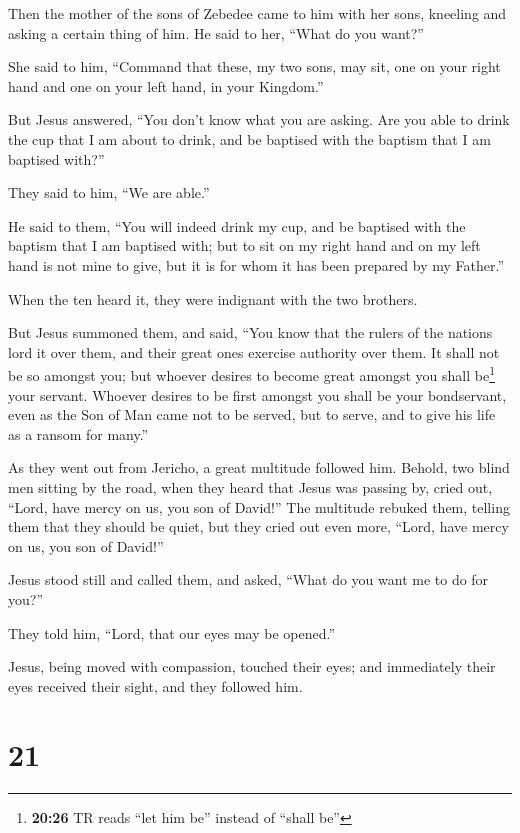  Then the mother of the sons of Zebedee came to him with
her sons, kneeling and asking a certain thing of him.  He
said to her, ``What do you want?''

She said to him, ``Command that these, my two sons, may sit, one on your
right hand and one on your left hand, in your Kingdom.''

 But Jesus answered, ``You don't know what you are
asking. Are you able to drink the cup that I am about to drink, and be
baptised with the baptism that I am baptised with?''

They said to him, ``We are able.''

 He said to them, ``You will indeed drink my cup, and be
baptised with the baptism that I am baptised with; but to sit on my
right hand and on my left hand is not mine to give, but it is for whom
it has been prepared by my Father.''

 When the ten heard it, they were indignant with the two
brothers.

 But Jesus summoned them, and said, ``You know that the
rulers of the nations lord it over them, and their great ones exercise
authority over them.  It shall not be so amongst you; but
whoever desires to become great amongst you shall be\footnote{\textbf{20:26}
  TR reads ``let him be'' instead of ``shall be''} your servant.
 Whoever desires to be first amongst you shall be your
bondservant,  even as the Son of Man came not to be
served, but to serve, and to give his life as a ransom for many.''

 As they went out from Jericho, a great multitude
followed him.  Behold, two blind men sitting by the road,
when they heard that Jesus was passing by, cried out, ``Lord, have mercy
on us, you son of David!''  The multitude rebuked them,
telling them that they should be quiet, but they cried out even more,
``Lord, have mercy on us, you son of David!''

 Jesus stood still and called them, and asked, ``What do
you want me to do for you?''

 They told him, ``Lord, that our eyes may be opened.''

 Jesus, being moved with compassion, touched their eyes;
and immediately their eyes received their sight, and they followed him.

\hypertarget{section-20}{%
\section{21}\label{section-20}}

